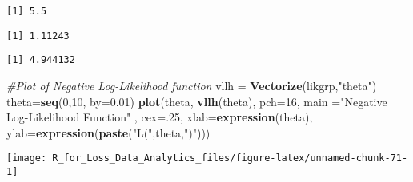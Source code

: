 \documentclass[]{book}
\newenvironment{Shaded}{\begin{snugshade}}{\end{snugshade}}
\newcommand{\KeywordTok}[1]{\textcolor[rgb]{0.13,0.29,0.53}{\textbf{#1}}}
\newcommand{\DataTypeTok}[1]{\textcolor[rgb]{0.13,0.29,0.53}{#1}}
\newcommand{\DecValTok}[1]{\textcolor[rgb]{0.00,0.00,0.81}{#1}}
\newcommand{\FloatTok}[1]{\textcolor[rgb]{0.00,0.00,0.81}{#1}}
\newcommand{\StringTok}[1]{\textcolor[rgb]{0.31,0.60,0.02}{#1}}
\newcommand{\CommentTok}[1]{\textcolor[rgb]{0.56,0.35,0.01}{\textit{#1}}}
\newcommand{\OperatorTok}[1]{\textcolor[rgb]{0.81,0.36,0.00}{\textbf{#1}}}
\newcommand{\NormalTok}[1]{#1}
\theoremstyle{definition}
\theoremstyle{definition}
\theoremstyle{definition}
\theoremstyle{remark}
\begin{document}
\begin{verbatim}
[1] 5.5
\end{verbatim}

\begin{Shaded}
\end{Shaded}

\begin{verbatim}
[1] 1.11243
\end{verbatim}

\begin{Shaded}
\end{Shaded}

\begin{verbatim}
[1] 4.944132
\end{verbatim}

\begin{Shaded}
\begin{Highlighting}[]
\CommentTok{#Plot of Negative Log-Likelihood function }
\NormalTok{vllh =}\StringTok{ }\KeywordTok{Vectorize}\NormalTok{(likgrp,}\StringTok{"theta"}\NormalTok{)}
\NormalTok{theta=}\KeywordTok{seq}\NormalTok{(}\DecValTok{0}\NormalTok{,}\DecValTok{10}\NormalTok{, }\DataTypeTok{by=}\FloatTok{0.01}\NormalTok{)}
\KeywordTok{plot}\NormalTok{(theta, }\KeywordTok{vllh}\NormalTok{(theta), }\DataTypeTok{pch=}\DecValTok{16}\NormalTok{, }\DataTypeTok{main =}\StringTok{"Negative Log-Likelihood Function"}\NormalTok{ , }\DataTypeTok{cex=}\NormalTok{.}\DecValTok{25}\NormalTok{, }
     \DataTypeTok{xlab=}\KeywordTok{expression}\NormalTok{(theta), }\DataTypeTok{ylab=}\KeywordTok{expression}\NormalTok{(}\KeywordTok{paste}\NormalTok{(}\StringTok{"L("}\NormalTok{,theta,}\StringTok{")"}\NormalTok{)))}
\end{Highlighting}
\end{Shaded}

\begin{center}\texttt{[image: R\_for\_Loss\_Data\_Analytics\_files/figure-latex/unnamed-chunk-71-1]} \end{center}
\end{document}
